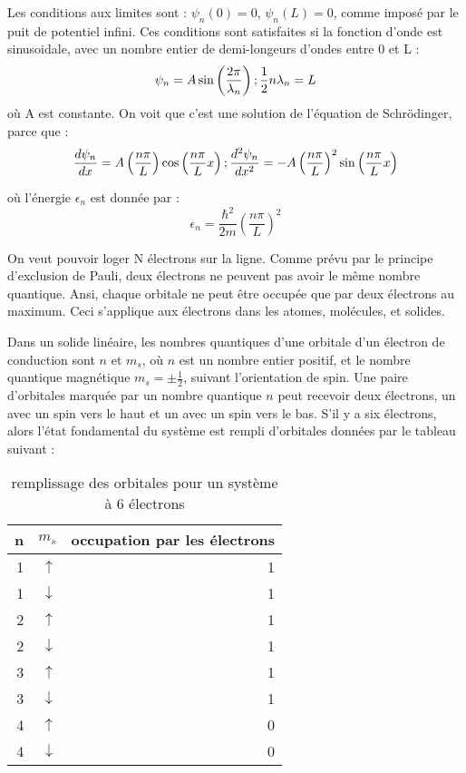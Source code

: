 Les conditions aux limites sont : $\psi_n (0) = 0$, $\psi_n(L)=0$, comme imposé 
par le puit de potentiel infini. Ces conditions sont satisfaites si la fonction
d'onde est sinusoidale, avec un nombre entier de demi-longeurs d'ondes entre 0
et L :
\begin{equation}
    \psi_n = A \sin\left( \frac{2\pi}{\lambda_n} \right) ; \hfill
    \frac{1}{2}n\lambda_n = L
\end{equation}
où A est constante.
On voit que c'est une solution de l'équation de Schrödinger, parce que :
\begin{equation}
    \frac{d\psi_n}{dx} = A \left( \frac{n\pi}{L} \right)
    \cos\left( \frac{n\pi}{L}x \right) ; \hfill \frac{d^2\psi_n}{dx^2} 
    = - A \left( \frac{n\pi}{L} \right)^2\sin\left( \frac{n\pi}{L}x \right)
\end{equation}

où l'énergie $\epsilon_n$ est donnée par :
\begin{equation}
    \epsilon_n = \frac{\hbar^2}{2m} \left( \frac{n\pi}{L}\right)^2
\label{en}
\end{equation}

On veut pouvoir loger N électrons sur la ligne. Comme prévu par le principe
d'exclusion de Pauli, deux électrons ne peuvent pas avoir le même nombre
quantique. Ansi, chaque orbitale ne peut être occupée que par deux électrons au
maximum. Ceci s'applique aux électrons dans les atomes, molécules, et solides.

Dans un solide linéaire, les nombres quantiques d'une orbitale d'un électron de
conduction sont $n$ et $m_s$, où $n$ est un nombre entier positif, et le nombre
quantique magnétique $m_s = \pm \frac{1}{2}$, suivant l'orientation de spin. Une
paire d'orbitales marquée par un nombre quantique $n$ peut recevoir deux
électrons, un avec un spin vers le haut et un avec un spin vers le bas. S'il y a
six électrons, alors l'état fondamental du système est rempli d'orbitales données
par le tableau suivant :

\begin{table}[ht]
    \begin{center}
        \begin{tabular}{rrr}
            \toprule
            n & $m_s$ & occupation par les électrons\\
            \midrule
            1 & $\uparrow$ & 1\\
            1 & $\downarrow$ & 1\\
            2 & $\uparrow$ & 1\\
            2 & $\downarrow$ & 1\\
            3 & $\uparrow$ & 1\\
            3 & $\downarrow$ & 1\\
            4 & $\uparrow$ & 0\\
            4 & $\downarrow$ & 0\\
            \bottomrule
        \end{tabular}
    \end{center}
    \label{}
    \caption{remplissage des orbitales pour un système à 6 électrons}
\end{table}

